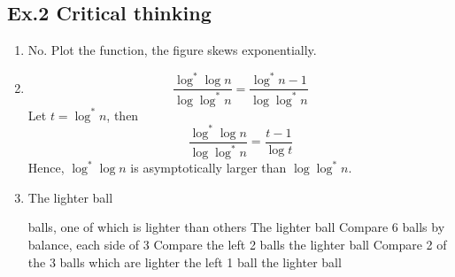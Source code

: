 \documentclass[a4paper]{article}
\begin{document}
\begin{enumerate}
\section*{Ex.2 Critical thinking}
	\begin{enumerate}
		\item No. Plot the function, the figure skews exponentially.
		\item $$\frac{\log^*\log{n}}{\log{\log^*{n}}} = \frac{\log^*{n}-1}{\log{\log^*{n}}}$$
		Let $t=\log^*{n}$, then
		$$\frac{\log^*\log{n}}{\log{\log^*{n}}} = \frac{t-1}{\log{t}}$$
		Hence, $\log^*\log{n}$ is asymptotically larger than $\log{\log^*{n}}$.
		\item
		\begin{algorithm}
			\caption{The lighter ball}
			\begin{algorithmic}[1]
				 balls, one of which is lighter than others
				\Ensure The lighter ball
				\State Compare 6 balls by balance, each side of 3
					\State Compare the left 2 balls
					\State \Return the lighter ball
				\Else
					\State Compare 2 of the 3 balls which are lighter
						\State \Return the left 1 ball
					\Else
						\State \Return the lighter ball
					\EndIf
				\EndIf
			\end{algorithmic}
		\end{algorithm}
	\end{enumerate}
\end{enumerate}
\end{document}
